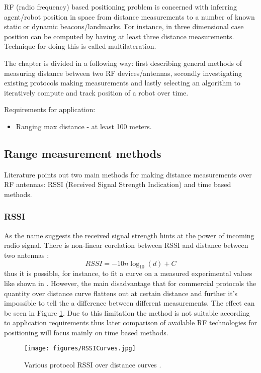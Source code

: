 
RF (radio frequency) based positioning problem is concerned with inferring agent/robot position in space from distance measurements to a number of known static or dynamic beacons/landmarks. For instance, in three dimensional case position can be computed by having at least three distance measurements. Technique for doing this is called multilateration.

The chapter is divided in a following way: first describing general methods of measuring distance between two RF devices/antennas, secondly investigating existing protocols making measurements and lastly selecting an algorithm to iteratively compute and track position of a robot over time.

Requirements for application:
\begin{itemize}
    \item Ranging max distance - at least 100 meters.
\end{itemize}

\subsection{Range measurement methods}

Literature points out two main methods for making distance measurements over RF antennas: RSSI (Received Signal Strength Indication) and time based methods.

\subsubsection{RSSI}

As the name suggests the received signal strength hints at the power of incoming radio signal. There is non-linear corelation between RSSI and distance between two antennas \cite{rssi-curves}:
$$
R S S I=-10 n \log _{10}(d)+C
$$
thus it is possible, for instance, to fit a curve on a measured experimental values like shown in \cite{rssi-curves}. However, the main disadvantage that for commercial protocols the quantity over distance curve flattens out at certain distance and further it's impossible to tell the a difference between different measurements. The effect can be seen in Figure \ref{fig:rssi-curves}. Due to this limitation the method is not suitable according to application requirements thus later comparison of available RF technologies for positioning will focus mainly on time based methods.
\begin{figure}
    \texttt{[image: figures/RSSICurves.jpg]}
    \caption{Various protocol RSSI over distance curves \cite{rssi-curves}.}
    \label{fig:rssi-curves}
\end{figure}
  
